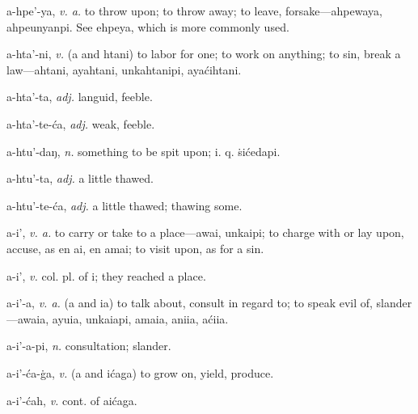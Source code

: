 \documentclass{article}
\begin{document}
\noindent a-hpe'-ya, \textit{v. a.} to throw upon; to throw away; to leave, forsake—ahpewaya, ahpeunyanpi. See ehpeya, which is more commonly used.

\noindent a-hta'-ni, \textit{v.} (a and htani) to labor for one; to work on anything; to sin, break a law—ahtani, ayahtani, unkahtanipi, ayaćihtani.

\noindent a-hta'-ta, \textit{adj.} languid, feeble.

\noindent a-hta'-te-ća, \textit{adj.} weak, feeble.

\noindent a-htu'-daŋ, \textit{n.} something to be spit upon; i. q. ṡićedapi.

\noindent a-htu'-ta, \textit{adj.} a little thawed.

\noindent a-htu'-te-ća, \textit{adj.} a little thawed; thawing some.

\noindent a-i', \textit{v. a.} to carry or take to a place—awai, unkaipi; to charge with or lay upon, accuse, as en ai, en amai; to visit upon, as for a sin.

\noindent a-i', \textit{v.} col. pl. of i; they reached a place.

\noindent a-i'-a, \textit{v. a.} (a and ia) to talk about, consult in regard to; to speak evil of, slander—awaia, ayuia, unkaiapi, amaia, aniia, aćiia.

\noindent a-i'-a-pi, \textit{n.} consultation; slander.

\noindent a-i'-ća-ġa, \textit{v.} (a and ićaga) to grow on, yield, produce.

\noindent a-i'-ćah, \textit{v.} cont. of aićaga.
\end{document}

